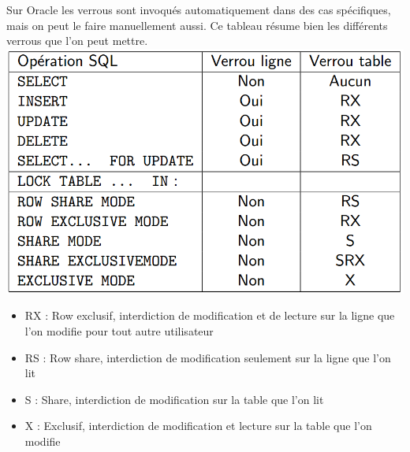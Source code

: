 \documentclass{report}
\begin{document}
Sur Oracle les verrous sont invoqués automatiquement dans des cas spécifiques, mais on peut le faire manuellement aussi. Ce tableau résume bien les différents verrous que l'on peut mettre.
\newline
\includegraphics[scale=0.6]{./Pictures/BD4.png}
\newline
\begin{itemize}
\item RX : Row exclusif, interdiction de modification et de lecture sur la ligne que l'on modifie pour tout autre utilisateur
\item RS : Row share, interdiction de modification seulement sur la ligne que l'on lit
\item S : Share, interdiction de modification sur la table que l'on lit
\item X : Exclusif, interdiction de modification et lecture sur la table que l'on modifie
\end{itemize}
\end{document}
